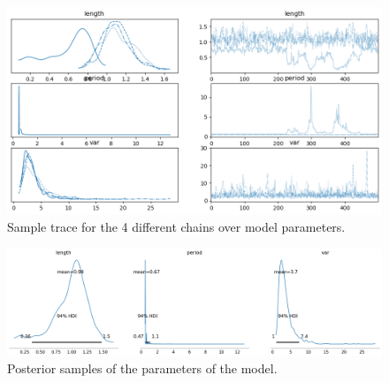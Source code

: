 \begin{figure}[p]
  \centering
  \includegraphics[width=1\textwidth]{./figures/nuts_trace.png}
  \caption{
    Sample trace for the 4 different chains over model parameters.
  }
  \label{fig:gp:nuts:trace}
\end{figure}
%
\begin{figure}[p]
  \centering
  \includegraphics[width=1\textwidth]{./figures/nuts_post.png}
  \caption{
    Posterior samples of the parameters of the model.
  }
  \label{fig:gp:nuts:post}
\end{figure}

